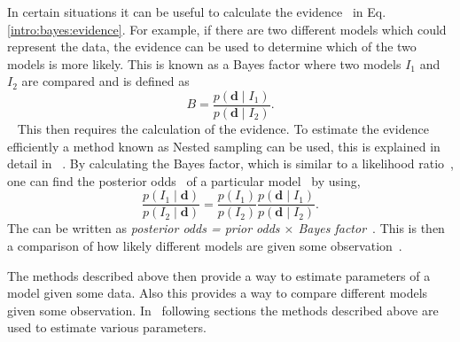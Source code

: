 In certain situations it can be useful to calculate the evidence~ in Eq.\ref{intro:bayes:evidence}.  For example, if there are two
different models which could represent the data, the evidence can be used to
determine which of the two models is more likely.  This is known as a Bayes
factor where two models $I_1$ and $I_2$ are compared and is defined as
%
\begin{equation}
B = \frac{p({\bm d} \mid I_1)}{p({\bm d} \mid I_2)}.
\end{equation}
%
~ This then requires the calculation of the
evidence.  To estimate the evidence efficiently a method known as Nested
sampling can be used, this is explained in detail in
\citep{skilling2006NestedSampling,speagle2019DynestyDynamic}~. By calculating the Bayes factor, which is similar to a
likelihood ratio~, one can find the posterior odds~ of a particular
model~ by using,
%
\begin{equation}
\frac{p(I_1 \mid \mathbf{d})}{p(I_2 \mid \mathbf{d})} = \frac{p(I_1)}{p(I_2)} \frac{p(\mathbf{d} \mid I_1)}{p(\mathbf{d} \mid I_2)}.
\end{equation}
%
The can be written as \textit{posterior odds = prior odds $\times$ Bayes
factor}~. This is then a
comparison of how likely different models are given some
observation~. 

The methods described above then provide a way to estimate parameters of a
model given some data.  Also this provides a way to compare different models
given some observation.  In~ following sections the methods
described above are used to estimate various parameters.~


